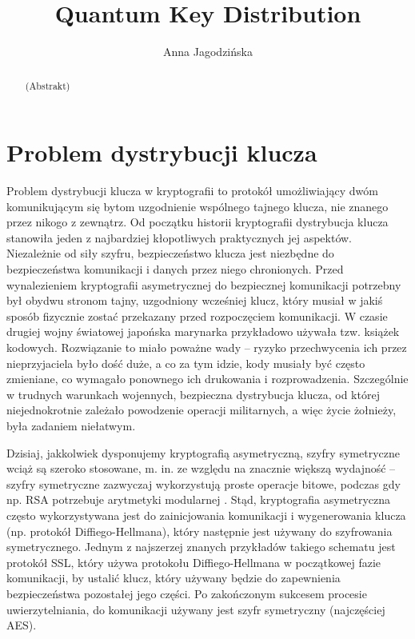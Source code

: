 \documentclass[10pt]{article}
\begin{document}
\begin{opening}

\title{Quantum Key Distribution}
\author[AGH University of Science and Technology, anna.jagodzinska91@gmail.com]{Anna Jagodzińska}

\begin{abstract}
  (Abstrakt)
\end{abstract}


\end{opening}

\section{Problem dystrybucji klucza}

Problem dystrybucji klucza w kryptografii to protokół umożliwiający dwóm komunikującym się bytom
uzgodnienie wspólnego tajnego klucza, nie znanego przez nikogo z zewnątrz. Od początku historii
kryptografii dystrybucja klucza stanowiła jeden z najbardziej kłopotliwych praktycznych jej aspektów.
Niezależnie od siły szyfru, bezpieczeństwo klucza jest niezbędne do bezpieczeństwa komunikacji i danych
przez niego chronionych. Przed wynalezieniem kryptografii asymetrycznej do bezpiecznej komunikacji 
potrzebny był obydwu stronom tajny, uzgodniony wcześniej klucz, który musiał w jakiś sposób fizycznie 
zostać przekazany przed rozpoczęciem komunikacji. W czasie drugiej wojny światowej japońska marynarka
przykładowo używała tzw. książek kodowych. Rozwiązanie to miało poważne wady -- ryzyko przechwycenia
ich przez nieprzyjaciela było dość duże, a co za tym idzie, kody musiały być często zmieniane, co 
wymagało ponownego ich drukowania i rozprowadzenia. Szczególnie w trudnych warunkach wojennych,
bezpieczna dystrybucja klucza, od której niejednokrotnie zależało powodzenie operacji militarnych,
a więc życie żołnieży, była zadaniem niełatwym. 

Dzisiaj, jakkolwiek dysponujemy kryptografią asymetryczną, szyfry symetryczne wciąż są szeroko 
stosowane, m. in. ze względu na znacznie większą wydajność \cite{IntelAES, IntelSSL} -- szyfry 
symetryczne zazwyczaj wykorzystują proste operacje bitowe, podczas gdy np. RSA potrzebuje arytmetyki
modularnej \footnotemark. Stąd, kryptografia asymetryczna często wykorzystywana jest do zainicjowania
komunikacji i wygenerowania klucza (np. protokół Diffiego-Hellmana), który następnie jest używany do
szyfrowania symetrycznego. Jednym z najszerzej znanych przykładów takiego schematu jest protokół
SSL, który używa protokołu Diffiego-Hellmana w początkowej fazie komunikacji, by ustalić klucz,
który używany będzie do zapewnienia bezpieczeństwa pozostałej jego części. Po zakończonym sukcesem
procesie uwierzytelniania, do komunikacji używany jest szyfr symetryczny (najczęściej AES).
\end{document}
